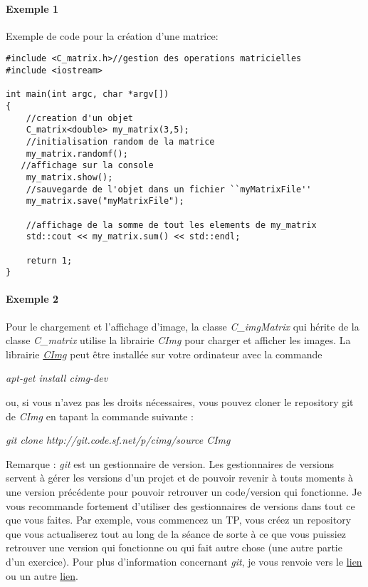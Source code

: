 \documentclass[10pt,a4paper]{article}
\begin{document}
\paragraph{Exemple 1}
Exemple de code pour la cr\'{e}ation d'une matrice: 
\begin{verbatim}
#include <C_matrix.h>//gestion des operations matricielles
#include <iostream>

int main(int argc, char *argv[])
{
    //creation d'un objet
    C_matrix<double> my_matrix(3,5);
    //initialisation random de la matrice
    my_matrix.randomf();
   //affichage sur la console
    my_matrix.show();
    //sauvegarde de l'objet dans un fichier ``myMatrixFile''
    my_matrix.save("myMatrixFile");

    //affichage de la somme de tout les elements de my_matrix
    std::cout << my_matrix.sum() << std::endl;

    return 1;
}
\end{verbatim}

\paragraph{Exemple 2} Pour le chargement et l'affichage d'image, la classe \textit{C\_imgMatrix} qui h\'{e}rite de la classe \textit{C\_matrix} utilise la librairie \textit{CImg} pour charger et afficher les images. La librairie \href{http://cimg.sourceforge.net/reference/group__cimg__tutorial.html}{\textit{CImg}} peut \^{e}tre install\'{e}e sur votre ordinateur avec la commande 
\begin{center}
	\textit{apt-get install cimg-dev}
\end{center}
ou, si vous n'avez pas les droits n\'{e}cessaires, vous pouvez cloner le repository git de \textit{CImg} en tapant la commande suivante : 
\begin{center}
	\textit{git clone http://git.code.sf.net/p/cimg/source CImg}
\end{center}
Remarque : \textit{git} est un gestionnaire de version. Les gestionnaires de versions servent \`{a} g\'{e}rer les versions d'un projet et de pouvoir revenir \`{a} touts moments \`{a} une version pr\'{e}c\'{e}dente pour pouvoir retrouver un code/version qui fonctionne. Je vous recommande fortement d'utiliser des gestionnaires de versions dans tout ce que vous faites. Par exemple, vous commencez un TP, vous cr\'{e}ez un repository que vous actualiserez tout au long de la s\'{e}ance de sorte \`{a} ce que vous puissiez retrouver une version qui fonctionne ou qui fait autre chose (une autre partie d'un exercice). Pour plus d'information concernant \textit{git}, je vous renvoie vers le \href{https://github.com/}{lien} ou un autre \href{http://rogerdudler.github.io/git-guide/}{lien}.
\end{document}
